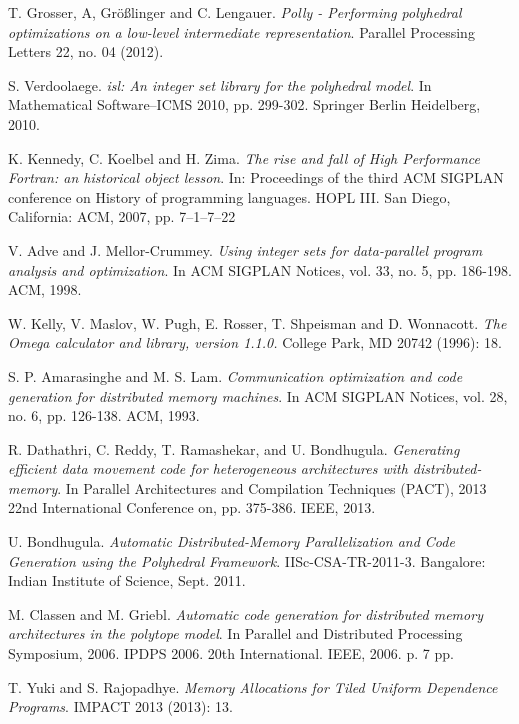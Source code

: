 \documentclass{sigplanconf}
\begin{document}
\begin{thebibliography}
T. Grosser, A, Gr{\"o}{\ss}linger and C. Lengauer. \emph{Polly - Performing polyhedral optimizations on a low-level intermediate representation}. Parallel Processing Letters 22, no. 04 (2012).

S. Verdoolaege. \emph{isl: An integer set library for the polyhedral model}. In Mathematical Software–ICMS 2010, pp. 299-302. Springer Berlin Heidelberg, 2010.


K. Kennedy, C. Koelbel and H. Zima. \emph{The rise and fall of High Performance
Fortran: an historical object lesson}. In: Proceedings of the third ACM SIGPLAN
conference on History of programming languages. HOPL III. San Diego, California:
ACM, 2007, pp. 7–1–7–22

V. Adve and J. Mellor-Crummey. \emph{Using integer sets for data-parallel program analysis and optimization}. In ACM SIGPLAN Notices, vol. 33, no. 5, pp. 186-198. ACM, 1998.

W. Kelly, V. Maslov, W. Pugh, E. Rosser, T. Shpeisman and D. Wonnacott. \emph{The Omega calculator and library, version 1.1.0.} College Park, MD 20742 (1996): 18.

S. P. Amarasinghe and M. S. Lam. \emph{Communication optimization and code generation for distributed memory machines}. In ACM SIGPLAN Notices, vol. 28, no. 6, pp. 126-138. ACM, 1993.

R. Dathathri, C. Reddy, T. Ramashekar, and U. Bondhugula. \emph{Generating efficient data movement code for heterogeneous architectures with distributed-memory}. In Parallel Architectures and Compilation Techniques (PACT), 2013 22nd International Conference on, pp. 375-386. IEEE, 2013.





U. Bondhugula. \emph{Automatic Distributed-Memory Parallelization and Code Generation
using the Polyhedral Framework}. IISc-CSA-TR-2011-3. Bangalore: Indian Institute
of Science, Sept. 2011.

M. Classen and M. Griebl. \emph{Automatic code generation for distributed memory architectures in the polytope model}. In Parallel and Distributed Processing Symposium, 2006. IPDPS 2006. 20th International. IEEE, 2006. p. 7 pp.

T. Yuki and S. Rajopadhye. \emph{Memory Allocations for Tiled Uniform Dependence Programs}. IMPACT 2013 (2013): 13.




\end{thebibliography}
\end{document}

